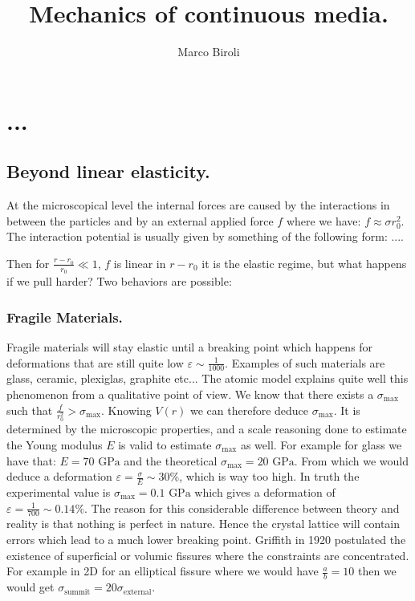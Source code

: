 \documentclass[10pt,a4paper]{book}
\author{Marco Biroli}
\title{Mechanics of continuous media.}
\begin{document}
\maketitle
\tableofcontents

\chapter{...}
\section{Beyond linear elasticity.}
At the microscopical level the internal forces are caused by the interactions in between the particles and by an external applied force $f$ where we have: $f \approx \sigma r_0^2$. The interaction potential is usually given by something of the following form:
....

Then for $\frac{r - r_0}{r_0} \ll 1$, $f$ is linear in $r - r_0$ it is the elastic regime, but what happens if we pull harder? Two behaviors are possible:
\subsection{Fragile Materials.}
Fragile materials will stay elastic until a breaking point which happens for deformations that are still quite low $\varepsilon \sim \frac{1}{1000}$. Examples of such materials are glass, ceramic, plexiglas, graphite etc... The atomic model explains quite well this phenomenon from a qualitative point of view. We know that there exists a $\sigma_\text{max}$ such that $\frac{f}{r_0^2} > \sigma_\text{max}$. Knowing $V(r)$ we can therefore deduce $\sigma_\text{max}$. It is determined by the microscopic properties, and a scale reasoning done to estimate the Young modulus $E$ is valid to estimate $\sigma_\text{max}$ as well. For example for glass we have that: $E = 70 \text{ GPa}$ and the theoretical $\sigma_\text{max} = 20 \text{ GPa}$. From which we would deduce a deformation $\varepsilon = \frac{\sigma}{E} \sim 30\%$, which is way too high. In truth the experimental value is $\sigma_\text{max} = 0.1 \text{ GPa}$ which gives a deformation of $\varepsilon = \frac{1}{700} \sim 0.14 \%$. The reason for this considerable difference between theory and reality is that nothing is perfect in nature. Hence the crystal lattice will contain errors which lead to a much lower breaking point. Griffith in 1920 postulated the existence of superficial or volumic fissures where the constraints are concentrated. For example in 2D for an elliptical fissure where we would have $\frac{a}{b} = 10$ then we would get $\sigma_\text{summit} = 20 \sigma_\text{external}$.
\end{document}
